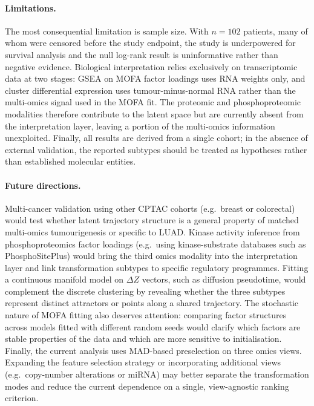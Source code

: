 \paragraph{Limitations.}
The most consequential limitation is sample size.
With $n = 102$ patients, many of whom were censored before the study endpoint, the
study is underpowered for survival analysis and the null log-rank result is
uninformative rather than negative evidence.
Biological interpretation relies exclusively on transcriptomic data at two stages:
GSEA on MOFA factor loadings uses RNA weights only, and cluster differential expression
uses tumour-minus-normal RNA rather than the multi-omics signal used in the MOFA fit.
The proteomic and phosphoproteomic modalities therefore contribute to the latent space
but are currently absent from the interpretation layer, leaving a portion of the
multi-omics information unexploited.
Finally, all results are derived from a single cohort; in the absence of external
validation, the reported subtypes should be treated as hypotheses rather than
established molecular entities.

\paragraph{Future directions.}
Multi-cancer validation using other CPTAC cohorts (e.g.\ breast or colorectal) would
test whether latent trajectory structure is a general property of matched multi-omics
tumourigenesis or specific to LUAD.
Kinase activity inference from phosphoproteomics factor loadings (e.g.\ using
kinase-substrate databases such as PhosphoSitePlus) would bring the third omics
modality into the interpretation layer and link transformation subtypes to specific
regulatory programmes.
Fitting a continuous manifold model on $\Delta Z$ vectors, such as diffusion
pseudotime, would complement the discrete clustering by revealing whether the three
subtypes represent distinct attractors or points along a shared trajectory.
The stochastic nature of MOFA fitting also deserves attention: comparing factor
structures across models fitted with different random seeds would clarify which
factors are stable properties of the data and which are more sensitive to
initialisation.
Finally, the current analysis uses MAD-based preselection on three omics views.
Expanding the feature selection strategy or incorporating additional views (e.g.\
copy-number alterations or miRNA) may better separate the transformation modes and
reduce the current dependence on a single, view-agnostic ranking criterion.
